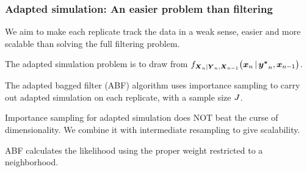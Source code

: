 \documentclass{beamer}
\begin{document}
\begin{frame}
  \frametitle{Adapted simulation: An easier problem than filtering}

  \begin{myitemize}
  \item
    We aim to make each replicate track the data in a weak sense, easier and more scalable than solving the full filtering problem.

\vspace{3mm}

  \item
    The adapted simulation problem is to draw from
$f_{\boldsymbol{X}_{n}|\boldsymbol{Y}_{n},\boldsymbol{X}_{n-1}}
  \big(
    \boldsymbol{x}_{n}{\,\vert\,} \boldsymbol{y^*}_{n},\boldsymbol{x}_{n-1}
  \big)$.

\vspace{3mm}

  \item The adapted bagged filter (ABF) algorithm uses importance sampling to carry out adapted simulation on each replicate, with a sample size $J$.

    \vspace{3mm}
    
  \item Importance sampling for adapted simulation does NOT beat the curse of dimensionality.
We combine it with intermediate resampling to give scalability.

\vspace{3mm}

    \item ABF calculates the likelihood using the proper weight restricted to a neighborhood.
\end{myitemize}
    
\end{frame}
\end{document}
